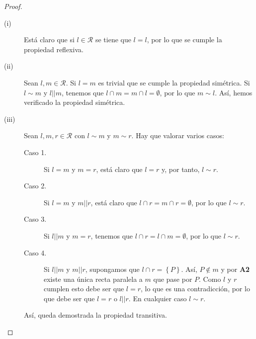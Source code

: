 \begin{proof}
\begin{description}
\item[(i)] Está claro que si $\displaystyle l \in \mathcal{R} $ se tiene que $\displaystyle l = l $, por lo que se cumple la propiedad reflexiva. 
\item[(ii)] Sean $\displaystyle l,m \in \mathcal{R} $. Si $\displaystyle l = m $ es trivial que se cumple la propiedad simétrica. Si $\displaystyle l \sim m $ y $\displaystyle l | | m $, tenemos que $\displaystyle l \cap m = m \cap l = \emptyset $, por lo que $\displaystyle m \sim l $. Así, hemos verificado la propiedad simétrica.
\item[(iii)] Sean $\displaystyle l,m,r \in \mathcal{R} $ con $\displaystyle l \sim m $ y $\displaystyle m \sim r $. Hay que valorar varios casos:
	\begin{description}
	\item[Caso 1.] Si $\displaystyle l = m $ y $\displaystyle m = r $, está claro que $\displaystyle l = r $ y, por tanto, $\displaystyle l \sim r $.
	\item[Caso 2.] Si $\displaystyle l = m $ y $\displaystyle m | | r $, está claro que $\displaystyle l \cap r = m \cap r = \emptyset $, por lo que $\displaystyle l \sim r $.
	\item[Caso 3.] Si $\displaystyle l | | m $ y $\displaystyle m = r $, tenemos que $\displaystyle l \cap r = l \cap m = \emptyset $, por lo que $\displaystyle l \sim r $.
	\item[Caso 4.] Si $\displaystyle l | | m  $ y $\displaystyle m | | r $, supongamos que $\displaystyle l \cap r = \left\{ P\right\}  $. Así, $\displaystyle P \not\in m $ y por \textbf{A2} existe una única recta paralela a $\displaystyle m $ que pase por $\displaystyle P $. Como $\displaystyle l $ y $\displaystyle r $ cumplen esto debe ser que $\displaystyle l = r $, lo que es una contradicción, por lo que debe ser que $\displaystyle l = r $ o $\displaystyle l | | r $. En cualquier caso $\displaystyle l \sim r $.
	\end{description}
	Así, queda demostrada la propiedad transitiva.
\end{description}
\end{proof}

